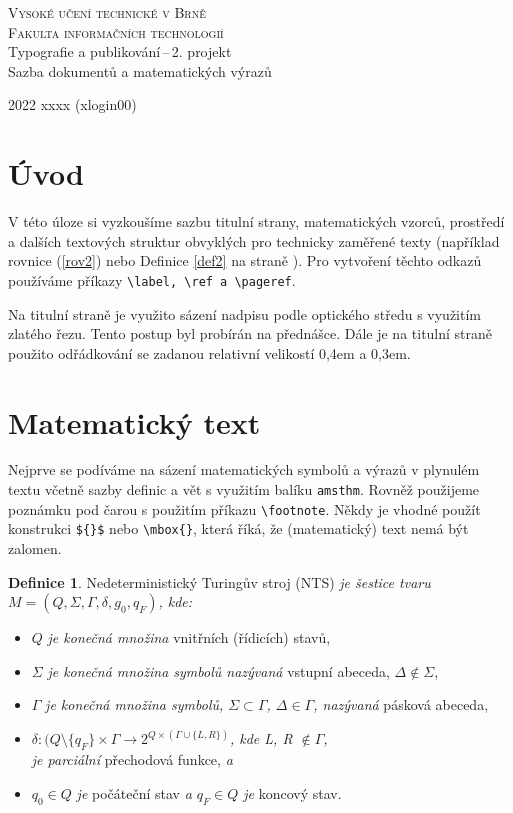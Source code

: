 \documentclass[a4paper, 11pt, twocolumn]{article}
\theoremstyle{definition}
\newtheorem{definice}{Definice}
\theoremstyle{definition}
\begin{document}
\begin{titlepage}
    \begin{center}
    \Huge\textsc{Vysoké učení technické v Brně\\
                \huge{Fakulta informačních technologií}}\\
    \LARGE{Typografie a publikování\,--\,2. projekt}\\
            Sazba dokumentů a matematických výrazů\\
\end{center}
{\Large 2022 \hfill xxxx (xlogin00)}
\end{titlepage}

\section*{Úvod}
V této úloze si vyzkoušíme sazbu titulní strany, matematických vzorců, prostředí a dalších textových struktur obvyklých pro technicky zaměřené texty (například rovnice (\ref{rov2}) nebo Definice \ref{def2} na straně \pageref{def2}). Pro vytvoření těchto odkazů používáme příkazy \verb|\label, \ref a \pageref|.\par
Na titulní straně je využito sázení nadpisu podle optického středu s využitím zlatého řezu. Tento postup byl probírán na přednášce. Dále je na titulní straně použito odřádkování se zadanou relativní velikostí 0,4em a 0,3em.

\section{Matematický text}
Nejprve se podíváme na sázení matematických symbolů a výrazů v plynulém textu včetně sazby definic a vět s využitím balíku \verb|amsthm|. Rovněž použijeme poznámku pod čarou s použitím příkazu \verb|\footnote|. Někdy je vhodné použít konstrukci \verb|${}$| nebo \verb|\mbox{}|, která říká, že (matematický) text nemá být zalomen. 

\begin{definice} 
     Nedeterministický Turingův stroj (NTS) \emph{je šestice tvaru $ M = (Q, \Sigma, \Gamma, \delta, g_0, q_F)$, kde:}
    \begin{itemize}
        \item $Q$ \emph{je konečná množina} vnitřních (řídicích) stavů,
        \item $\Sigma$ \emph{je konečná množina symbolů nazývaná} vstupní abeceda, $\Delta \notin \Sigma$,
        \item $\Gamma$ \emph{je konečná množina symbolů, $\Sigma \subset \Gamma$, $\Delta \in \Gamma$, nazývaná} pásková abeceda,
        \item $\delta : (Q\setminus\{q_F\} \times \Gamma \rightarrow 2^{Q\times(\Gamma\cup\{L,R\})}$\emph{, kde L, R $\notin \Gamma$,\\ je parciální} přechodová funkce, \emph{a}
        \item $q_0 \in Q$ \emph{je} počáteční stav \emph{a $q_F \in Q$ je} koncový stav.
    \end{itemize}
\end{definice}
\end{document}
